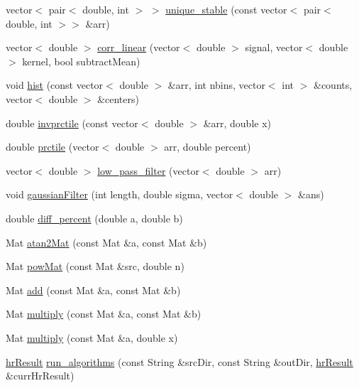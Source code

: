 \begin{DoxyCompactItemize}
\item 
vector$<$ pair$<$ double, int $>$ $>$ \hyperlink{namespace_m_h_r_a22cd3e8872333ff4c203c15821bf69bb}{unique\+\_\+stable} (const vector$<$ pair$<$ double, int $>$$>$ \&arr)
\item 
vector$<$ double $>$ \hyperlink{namespace_m_h_r_a4e7d8efbc84874e131049dc705488cc9}{corr\+\_\+linear} (vector$<$ double $>$ signal, vector$<$ double $>$ kernel, bool subtract\+Mean)
\item 
void \hyperlink{namespace_m_h_r_ab46344d4248f6c55622fef14c1eb78c7}{hist} (const vector$<$ double $>$ \&arr, int nbins, vector$<$ int $>$ \&counts, vector$<$ double $>$ \&centers)
\item 
double \hyperlink{namespace_m_h_r_a4d04157ea7582bbd0a165e1a8a679219}{invprctile} (const vector$<$ double $>$ \&arr, double x)
\item 
double \hyperlink{namespace_m_h_r_a401757908f80823dd6c6ced91e55d751}{prctile} (vector$<$ double $>$ arr, double percent)
\item 
vector$<$ double $>$ \hyperlink{namespace_m_h_r_af85b8b218e683bde30d7ee0329b29716}{low\+\_\+pass\+\_\+filter} (vector$<$ double $>$ arr)
\item 
void \hyperlink{namespace_m_h_r_a0380a36a3a26da3c0a32e0f4b3d9fec9}{gaussian\+Filter} (int length, double sigma, vector$<$ double $>$ \&ans)
\item 
double \hyperlink{namespace_m_h_r_a2e51d3fdfa37bc717ccc0c4557d64445}{diff\+\_\+percent} (double a, double b)
\item 
Mat \hyperlink{namespace_m_h_r_ad90e260536ab41e3da12f739038743d0}{atan2\+Mat} (const Mat \&a, const Mat \&b)
\item 
Mat \hyperlink{namespace_m_h_r_afef7e1a6e6fe95a9debb07c2d7ba3008}{pow\+Mat} (const Mat \&src, double n)
\item 
Mat \hyperlink{namespace_m_h_r_ac0d7c563ab4072cf5cba2d2b1cb3761e}{add} (const Mat \&a, const Mat \&b)
\item 
Mat \hyperlink{namespace_m_h_r_a497a8cfdabb210ba4d68b592fb589e00}{multiply} (const Mat \&a, const Mat \&b)
\item 
Mat \hyperlink{namespace_m_h_r_a22b0fbac0253b08d84d9c2493324e5db}{multiply} (const Mat \&a, double x)
\item 
\hyperlink{struct_m_h_r_1_1hr_result}{hr\+Result} \hyperlink{namespace_m_h_r_a883e36fb9e762e11d5dcdb28b0b8e236}{run\+\_\+algorithms} (const String \&src\+Dir, const String \&out\+Dir, \hyperlink{struct_m_h_r_1_1hr_result}{hr\+Result} \&curr\+Hr\+Result)
\end{DoxyCompactItemize}
